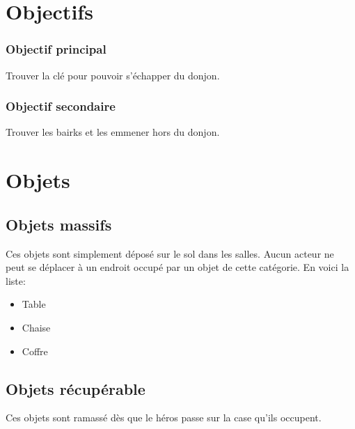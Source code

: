 \documentclass[a4paper, 11pt]{report}
\begin{document}

    \chapter{Objectifs}
      \subsection{Objectif principal}
        Trouver la clé pour pouvoir s'échapper du donjon.
        
      \subsection{Objectif secondaire}
        Trouver les bairks et les emmener hors du donjon.
      
    \chapter{Objets}
      \section{Objets massifs}
        Ces objets sont simplement déposé sur le sol dans les salles. Aucun acteur ne peut se déplacer
        à un endroit occupé par un objet de cette catégorie. En voici la liste:
        \begin{itemize}
        \item{Table}
        \item{Chaise}
        \item{Coffre}
        \end{itemize}
        
      \section{Objets récupérable}
        Ces objets sont ramassé dès que le héros passe sur la case qu'ils occupent.
        
\end{document}
